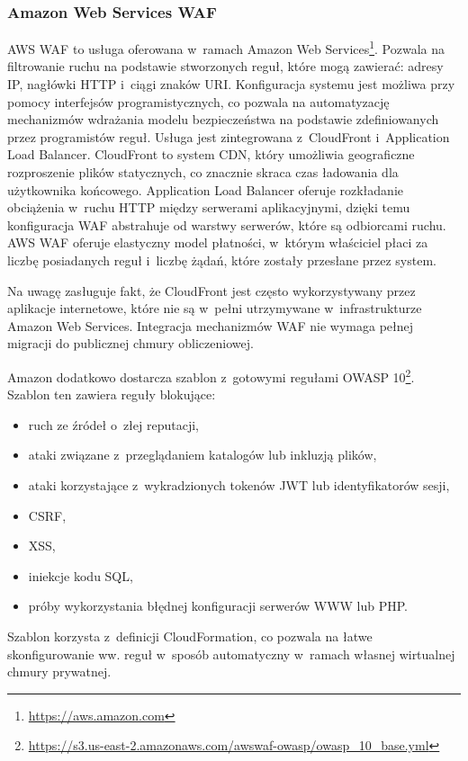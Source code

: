 \documentclass[12pt,a4paper,polish,thesis]{dcsbook}
\begin{document}
\subsubsection{Amazon Web Services WAF}
AWS WAF \cite{awswaf} to usługa oferowana w~ramach Amazon Web Services\footnote{\url{https://aws.amazon.com}}. Pozwala na filtrowanie ruchu na podstawie stworzonych reguł, które mogą zawierać: adresy IP, nagłówki HTTP i~ciągi znaków URI. Konfiguracja systemu jest możliwa przy pomocy interfejsów programistycznych, co pozwala na automatyzację mechanizmów wdrażania modelu bezpieczeństwa na podstawie zdefiniowanych przez programistów reguł. Usługa jest zintegrowana z~CloudFront i~Application Load Balancer. CloudFront to system CDN, który umożliwia geograficzne rozproszenie plików statycznych, co znacznie skraca czas ładowania dla użytkownika końcowego. Application Load Balancer oferuje rozkładanie obciążenia w~ruchu HTTP między serwerami aplikacyjnymi, dzięki temu konfiguracja WAF abstrahuje od warstwy serwerów, które są odbiorcami ruchu. AWS WAF oferuje elastyczny model płatności, w~którym właściciel płaci za liczbę posiadanych reguł i~liczbę żądań, które zostały przesłane przez system.

Na uwagę zasługuje fakt, że CloudFront jest często wykorzystywany przez aplikacje internetowe, które nie są w~pełni utrzymywane w~infrastrukturze Amazon Web Services. Integracja mechanizmów WAF nie wymaga pełnej migracji do publicznej chmury obliczeniowej.

Amazon dodatkowo dostarcza szablon z~gotowymi regułami OWASP 10\footnote{\url{https://s3.us-east-2.amazonaws.com/awswaf-owasp/owasp_10_base.yml}}. Szablon ten zawiera reguły blokujące:
\begin{itemize}
\item ruch ze źródeł o~złej reputacji,
\item ataki związane z~przeglądaniem katalogów lub inkluzją plików,
\item ataki korzystające z~wykradzionych tokenów JWT lub identyfikatorów sesji,
\item CSRF,
\item XSS,
\item iniekcje kodu SQL,
\item próby wykorzystania błędnej konfiguracji serwerów WWW lub PHP.
\end{itemize}
Szablon korzysta z~definicji CloudFormation, co pozwala na łatwe skonfigurowanie ww. reguł w~sposób automatyczny w~ramach własnej wirtualnej chmury prywatnej.
\end{document}
